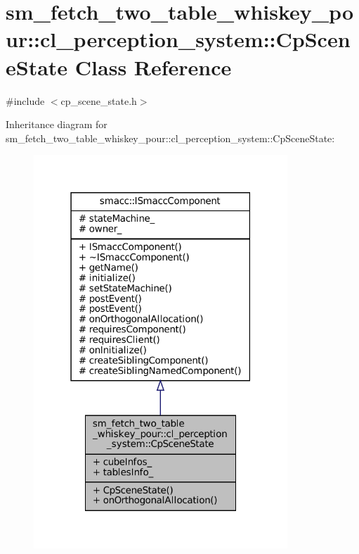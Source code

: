 \hypertarget{classsm__fetch__two__table__whiskey__pour_1_1cl__perception__system_1_1CpSceneState}{}\section{sm\+\_\+fetch\+\_\+two\+\_\+table\+\_\+whiskey\+\_\+pour\+:\+:cl\+\_\+perception\+\_\+system\+:\+:Cp\+Scene\+State Class Reference}
\label{classsm__fetch__two__table__whiskey__pour_1_1cl__perception__system_1_1CpSceneState}


{\ttfamily \#include $<$cp\+\_\+scene\+\_\+state.\+h$>$}



Inheritance diagram for sm\+\_\+fetch\+\_\+two\+\_\+table\+\_\+whiskey\+\_\+pour\+:\+:cl\+\_\+perception\+\_\+system\+:\+:Cp\+Scene\+State\+:
\nopagebreak
\begin{figure}[H]
\begin{center}
\leavevmode
\includegraphics[width=271pt]{classsm__fetch__two__table__whiskey__pour_1_1cl__perception__system_1_1CpSceneState__inherit__graph}
\end{center}
\end{figure}


